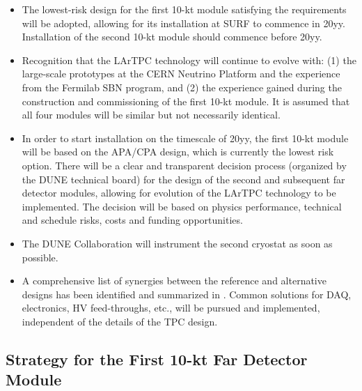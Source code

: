 \begin{itemize}
\item The lowest-risk design for the first 10-kt module satisfying the requirements 
will be adopted, allowing for its installation at SURF to commence in 20yy. %
Installation  of the second 10-kt module should commence before 20yy. %

\item  Recognition that the LArTPC technology will continue to evolve with: (1) the 
large-scale prototypes at the CERN Neutrino Platform and the experience from the 
Fermilab SBN program, and (2) the experience gained during the construction and 
commissioning of the first 10-kt module. It is assumed that all four modules 
will be similar but not necessarily identical.

\item  In order to start installation on the timescale of 20yy, %
the first  10-kt module will be based on the APA/CPA design, which is currently the lowest
risk option. There will be a clear and transparent decision process (organized by the DUNE 
technical board) for the design 
of the second and subsequent far detector modules, allowing for evolution of the 
LArTPC technology to be implemented. The decision will be 
based on physics performance, technical and schedule risks, costs and funding 
opportunities.

\item The DUNE Collaboration will instrument the second cryostat as soon as possible.

\item A comprehensive list of synergies between the reference and alternative designs 
has been identified and summarized in \voldune. Common solutions for DAQ, 
electronics, HV feed-throughs, etc., will be pursued and implemented, independent 
of the details of the TPC design.

\end{itemize}
\subsection{Strategy for the First 10-kt Far Detector Module}
\label{v1ch3:first-fd-mod-strategy}

